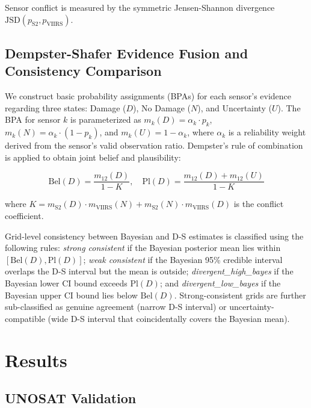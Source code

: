 \documentclass[wcp]{jmlr}
\begin{document}
Sensor conflict is measured by the symmetric Jensen-Shannon divergence
$\mathrm{JSD}(p_{\text{S2}}, p_{\text{VIIRS}})$.

\subsection{Dempster-Shafer Evidence Fusion and Consistency
Comparison}\label{sec:ds}

We construct basic probability assignments (BPAs) for each sensor's evidence
regarding three states: Damage ($D$), No Damage ($N$), and Uncertainty
($U$). The BPA for sensor $k$ is parameterized as $m_k(D) = \alpha_k \cdot
p_k$, $m_k(N) = \alpha_k \cdot (1 - p_k)$, and $m_k(U) = 1 - \alpha_k$,
where $\alpha_k$ is a reliability weight derived from the sensor's valid
observation ratio. Dempster's rule of combination is applied to obtain joint
belief and plausibility:

\begin{equation}
\mathrm{Bel}(D) = \frac{m_{12}(D)}{1 - K},\quad
\mathrm{Pl}(D) = \frac{m_{12}(D) + m_{12}(U)}{1 - K}
\label{eq:ds}
\end{equation}

where $K = m_{\text{S2}}(D) \cdot m_{\text{VIIRS}}(N) + m_{\text{S2}}(N)
\cdot m_{\text{VIIRS}}(D)$ is the conflict coefficient.

Grid-level consistency between Bayesian and D-S estimates is classified
using the following rules: \emph{strong consistent} if the Bayesian
posterior mean lies within $[\mathrm{Bel}(D), \mathrm{Pl}(D)]$;
\emph{weak consistent} if the Bayesian 95\% credible interval overlaps the
D-S interval but the mean is outside; \emph{divergent\_high\_bayes} if the
Bayesian lower CI bound exceeds $\mathrm{Pl}(D)$; and
\emph{divergent\_low\_bayes} if the Bayesian upper CI bound lies below
$\mathrm{Bel}(D)$. Strong-consistent grids are further sub-classified as
genuine agreement (narrow D-S interval) or uncertainty-compatible (wide D-S
interval that coincidentally covers the Bayesian mean).

\section{Results}\label{sec:results}

\subsection{UNOSAT Validation}
\end{document}
